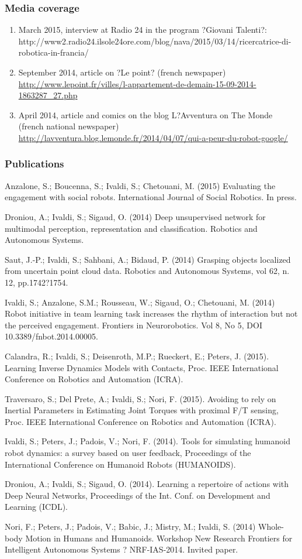 \subsubsection{Media coverage}
\begin{enumerate}
\item  March 2015, interview at Radio 24 in the program ?Giovani Talenti?:
http://www2.radio24.ilsole24ore.com/blog/nava/2015/03/14/ricercatrice-di-robotica-in-francia/
\item  September 2014, article on ?Le point? (french newspaper)
\url{http://www.lepoint.fr/villes/l-appartement-de-demain-15-09-2014-1863287_27.php}
\item  April 2014, article and comics on the blog L?Avventura on The Monde (french national newspaper) \url{http://lavventura.blog.lemonde.fr/2014/04/07/qui-a-peur-du-robot-google/}
\end{enumerate}

\subsubsection{Publications}
Anzalone, S.; Boucenna, S.; Ivaldi, S.; Chetouani, M. (2015) Evaluating the engagement with social robots. International Journal of Social Robotics. In press.

Droniou, A.; Ivaldi, S.; Sigaud, O.  (2014) Deep unsupervised network for multimodal perception, representation and classification. Robotics and Autonomous Systems.

Saut, J.-P.; Ivaldi, S.; Sahbani, A.; Bidaud, P.  (2014) Grasping objects localized from uncertain point cloud data. Robotics and Autonomous Systems, vol 62, n. 12, pp.1742?1754.

Ivaldi, S.; Anzalone, S.M.; Rousseau, W.; Sigaud, O.; Chetouani, M. (2014) Robot initiative in team learning task increases the rhythm of interaction but not the perceived engagement. Frontiers in Neurorobotics. Vol 8, No 5, DOI 10.3389/fnbot.2014.00005.

Calandra, R.; Ivaldi, S.; Deisenroth, M.P.; Rueckert, E.; Peters, J. (2015). Learning Inverse Dynamics Models with Contacts, Proc. IEEE International Conference on Robotics and Automation (ICRA). 

Traversaro, S.; Del Prete, A.; Ivaldi, S.; Nori, F. (2015). Avoiding to rely on Inertial Parameters in Estimating Joint Torques with proximal F/T sensing, Proc. IEEE International Conference on Robotics and Automation (ICRA). 

Ivaldi, S.; Peters, J.; Padois, V.; Nori, F. (2014). Tools for simulating humanoid robot dynamics: a survey based on user feedback, Proceedings of the International Conference on Humanoid Robots (HUMANOIDS).

Droniou, A.; Ivaldi, S.; Sigaud, O. (2014). Learning a repertoire of actions with Deep Neural Networks, Proceedings of the Int. Conf. on Development and Learning (ICDL).

Nori, F.;  Peters, J.; Padois, V.; Babic, J.; Mistry, M.; Ivaldi, S.  (2014) Whole-body Motion in Humans and Humanoids. Workshop New Research Frontiers for Intelligent Autonomous Systems ? NRF-IAS-2014. Invited paper.


